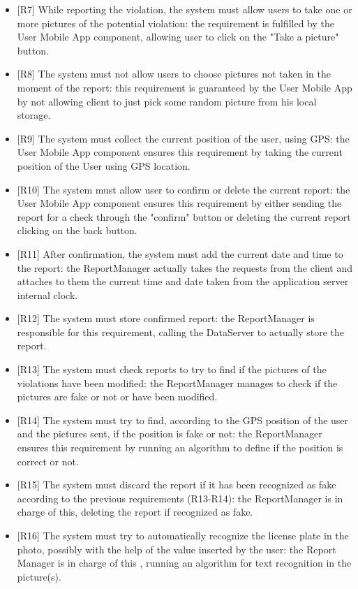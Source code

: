 \documentclass[a4paper]{report}
\begin{document}
\begin{itemize}
\item {[R7]}	\label{R7}While reporting the violation, the system must allow users to take one or more pictures of the potential violation: the requirement is fulfilled by the User Mobile App component, allowing user to click on the "Take a picture" button.
\item {[R8]}	\label{R8}The system must not allow users to choose pictures not taken in the moment of the report: this requirement is guaranteed by the User Mobile App by not allowing client to just pick some random picture from his local storage.
\item {[R9]}	\label{R9}The system must collect the current position of the user, using GPS: the User Mobile App component ensures this requirement by taking the current position of the User using GPS location.
\item {[R10]}	\label{R10}The system must allow user to confirm or delete the current report: the User Mobile App component ensures this requirement by either sending the report for a check through the "confirm" button or deleting the current report clicking on the back button.
\item {[R11]}	\label{R11}After confirmation, the system must add the current date and time to the report: the ReportManager actually takes the requests from the client and attaches to them the current time and date taken from the application server internal clock.
\item {[R12]}	\label{R12}The system must store confirmed report: the ReportManager is responsible for this requirement, calling the DataServer to actually store the report.
\item {[R13]}	\label{R13}The system must check reports to try to find if the pictures of the violations have been modified: the ReportManager manages to check if the pictures are fake or not or have been modified.
\item {[R14]}	\label{R14}The system must try to find, according to the GPS position of the user and the pictures sent, if the position is fake or not: the ReportManager ensures this requirement by running an algorithm to define if the position is correct or not. 
\item {[R15]}	\label{R15}The system must discard the report if it has been recognized as fake according to the previous requirements (R13-R14): the ReportManager is in charge of this, deleting the report if recognized as fake.
\item {[R16]}	\label{R16}The system must try to automatically recognize the license plate in the photo, possibly with the help of the value inserted by the user: the Report Manager is in charge of this , running an algorithm for text recognition in the picture(s).

\end{itemize}
\end{document}
